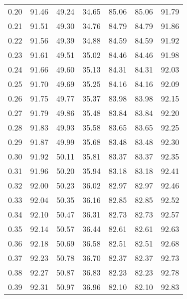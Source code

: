 \begin{tabular}{|c|c|c|c|c|c|c|}
      0.20 &     91.46 &     49.24 &      34.65 &   85.06 &      85.06 &         91.79 \\
      0.21 &     91.51 &     49.30 &      34.76 &   84.79 &      84.79 &         91.86 \\
      0.22 &     91.56 &     49.39 &      34.88 &   84.59 &      84.59 &         91.92 \\
      0.23 &     91.61 &     49.51 &      35.02 &   84.46 &      84.46 &         91.98 \\
      0.24 &     91.66 &     49.60 &      35.13 &   84.31 &      84.31 &         92.03 \\
      0.25 &     91.70 &     49.69 &      35.25 &   84.16 &      84.16 &         92.09 \\
      0.26 &     91.75 &     49.77 &      35.37 &   83.98 &      83.98 &         92.15 \\
      0.27 &     91.79 &     49.86 &      35.48 &   83.84 &      83.84 &         92.20 \\
      0.28 &     91.83 &     49.93 &      35.58 &   83.65 &      83.65 &         92.25 \\
      0.29 &     91.87 &     49.99 &      35.68 &   83.48 &      83.48 &         92.30 \\
      0.30 &     91.92 &     50.11 &      35.81 &   83.37 &      83.37 &         92.35 \\
      0.31 &     91.96 &     50.20 &      35.94 &   83.18 &      83.18 &         92.41 \\
      0.32 &     92.00 &     50.23 &      36.02 &   82.97 &      82.97 &         92.46 \\
      0.33 &     92.04 &     50.35 &      36.16 &   82.85 &      82.85 &         92.52 \\
      0.34 &     92.10 &     50.47 &      36.31 &   82.73 &      82.73 &         92.57 \\
      0.35 &     92.14 &     50.57 &      36.44 &   82.61 &      82.61 &         92.63 \\
      0.36 &     92.18 &     50.69 &      36.58 &   82.51 &      82.51 &         92.68 \\
      0.37 &     92.23 &     50.78 &      36.70 &   82.37 &      82.37 &         92.73 \\
      0.38 &     92.27 &     50.87 &      36.83 &   82.23 &      82.23 &         92.78 \\
      0.39 &     92.31 &     50.97 &      36.96 &   82.10 &      82.10 &         92.83 \\

\end{tabular}
